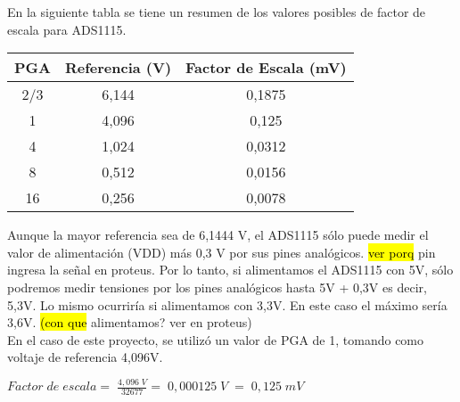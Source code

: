 En la siguiente tabla se tiene un resumen de los valores posibles de factor de escala para ADS1115.
\begin{table}[h]
	\centering
	\begin{tabular}{|c|c|c|}
		\hline
		\textbf{PGA} & \textbf{Referencia (V)} & \textbf{Factor de Escala (mV)} \\ \hline
		2/3          & 6,144                   & 0,1875                         \\ \hline
		1            & 4,096                   & 0,125                          \\ \hline
		4            & 1,024                   & 0,0312                         \\ \hline
		8            & 0,512                   & 0,0156                         \\ \hline
		16           & 0,256                   & 0,0078                         \\ \hline
	\end{tabular}
\end{table}

Aunque la mayor referencia sea de 6,1444 V, el ADS1115 sólo puede medir el valor de alimentación (VDD) más 0,3 V por sus pines analógicos. \hl{ver porq} pin ingresa la señal en proteus. Por lo tanto, si alimentamos el ADS1115 con 5V, sólo podremos medir tensiones por los pines analógicos hasta 5V + 0,3V es decir, 5,3V. Lo mismo ocurriría si alimentamos con 3,3V. En este caso el máximo sería 3,6V. \hl{(con que} alimentamos? ver en proteus)\\
En el caso de este proyecto, se utilizó un valor de PGA de 1, tomando como voltaje de referencia 4,096V.
\begin{center}
	\begin{math}
		Factor\;de\;escala=\;\frac{4,096\;V}{32677}=\;0,000125\;V\;=\;0,125\;mV
	\end{math}
\end{center}

